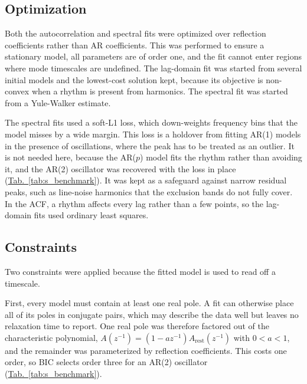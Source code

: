 \documentclass[pdflatex,lineno,sn-nature]{sn-jnl}
\newcommand{\tabpanel}[2][]{\hyperref[#2]{Tab.~#1\ref*{#2}}}
\theoremstyle{thmstyleone}
\theoremstyle{thmstyletwo}
\theoremstyle{thmstylethree}
\begin{document}
\subsection{Optimization}

Both the autocorrelation and spectral fits were optimized over reflection coefficients rather than AR coefficients. This was performed to ensure a stationary model, all parameters are of order one, and the fit cannot enter regions where mode timescales are undefined. The lag-domain fit was started from several initial models and the lowest-cost solution kept, because its objective is non-convex when a rhythm is present from harmonics. The spectral fit was started from a Yule-Walker estimate.

The spectral fits used a soft-L1 loss, which down-weights frequency bins that the model misses by a wide margin. This loss is a holdover from fitting AR(1) models in the presence of oscillations, where the peak has to be treated as an outlier. It is not needed here, because the AR($p$) model fits the rhythm rather than avoiding it, and the AR(2) oscillator was recovered with the loss in place (\tabpanel{tab:s_benchmark}). It was kept as a safeguard against narrow residual peaks, such as line-noise harmonics that the exclusion bands do not fully cover. In the ACF, a rhythm affects every lag rather than a few points, so the lag-domain fits used ordinary least squares.

\subsection{Constraints}

Two constraints were applied because the fitted model is used to read off a timescale.

First, every model must contain at least one real pole. A fit can otherwise place all of its poles in conjugate pairs, which may describe the data well but leaves no relaxation time to report. One real pole was therefore factored out of the characteristic polynomial, $A(z^{-1}) = (1 - a z^{-1})A_{\mathrm{rest}}(z^{-1})$ with $0 < a < 1$, and the remainder was parameterized by reflection coefficients. This costs one order, so BIC selects order three for an AR(2) oscillator (\tabpanel{tab:s_benchmark}).
\end{document}

